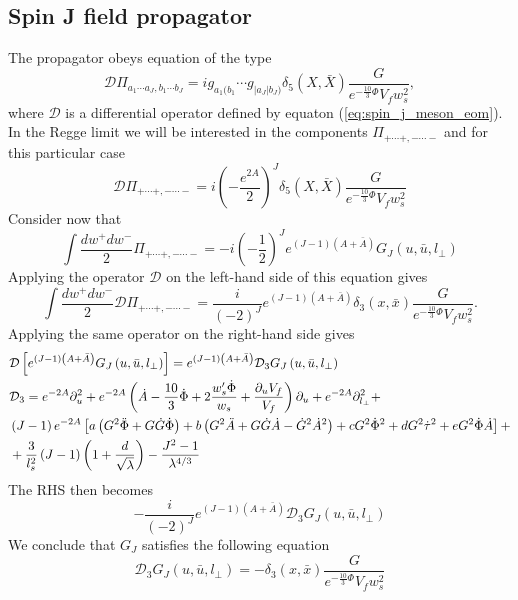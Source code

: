\documentclass[a4paper,12pt]{article}
\begin{document}
\subsection{Spin J field propagator}
The propagator obeys equation of the type
\begin{equation}
\mathcal{D} \Pi_{a_1 \cdots a_J, b_1 \cdots b_J} = i g_{a_1(b_1} \cdots g_{|a_J|b_J)} \delta_5 \left(X, \bar{X}\right) \frac{G}{e^{-\frac{10}{3}\Phi}V_f w_s^2},
\end{equation}
where $\mathcal{D}$ is a differential operator defined by equaton (\ref{eq:spin_j_meson_eom}).
In the Regge limit we will be interested in the components $\Pi_{+\cdots+,-\cdots-}$ and for this particular case
\begin{equation}
\mathcal{D} \Pi_{+\cdots+,-\cdots-} = i {\left( - \frac{e^{2A}}{2}\right)}^J  \delta_5 \left(X, \bar{X}\right) \frac{G}{e^{-\frac{10}{3}\Phi}V_f w_s^2}
\end{equation}
Consider now that
\begin{equation}
\int \frac{dw^+ dw^-}{2} \Pi_{+\cdots+, - \cdots -} = -i {\left(-\frac{1}{2}\right)}^J e^{\left(J-1\right)(A+\bar{A})} G_J \left(u, \bar{u}, l_\perp\right)
\end{equation}
Applying the operator $\mathcal{D}$ on the left-hand side of this equation gives
\begin{equation}
\int \frac{dw^+ dw^-}{2} \mathcal{D} \Pi_{+\cdots+, - \cdots -} = \frac{i}{{\left(-2\right)}^J} e^{\left(J-1\right)\left(A+\bar{A}\right)} \delta_3\left(x, \bar{x}\right) \frac{G}{e^{-\frac{10}{3}\Phi}V_f w_s^2}.
\end{equation}
Applying the same operator on the right-hand side gives
\begin{align}
&\mathcal{D} \left[ e^{\left(J-1\right) \left(A+\bar{A}\right)} G_J \left(u, \bar{u}, l_\perp\right) \right] = e^{\left(J-1\right)\left(A+\bar{A}\right)} \mathcal{D}_3 G_J \left(u, \bar{u}, l_\perp\right) \notag \\
&\mathcal{D}_3 = e^{-2A} \partial_u^2 + e^{-2A} \left( \dot{A} - \frac{10}{3} \dot{\Phi} + 2 \frac{w_s' \dot{\Phi}}{w_s} + \frac{\partial_u V_f}{V_f} \right) \partial_u + e^{-2A} \partial^2_{l_\perp} + \notag \\
& \left(J-1\right) e^{-2A} \left[ a \left(G^2\ddot{\Phi} + G \dot{G} \dot{\Phi} \right) + b \left(G^2 \ddot{A} + G \dot{G} \dot{A} - \dot{G}^2 {\dot{A}}^2\right) + c G^2 {\dot{\Phi}}^2 + d G^2 {\dot{\tau}}^2 + e G^2 \dot{\Phi} \dot{A} \right] + \notag \\
& + \frac{3}{l_s^2} \left(J-1\right)\left(1+\frac{d}{\sqrt{\lambda}}\right) - \frac{J^2-1}{\lambda^{4/3}}
\end{align}
The RHS then becomes
\begin{equation}
- \frac{i}{{\left(-2\right)}^J} e^{\left(J-1\right)\left(A+\bar{A}\right)} \mathcal{D}_3 G_J \left(u, \bar{u}, l_\perp\right)
\end{equation}
We conclude that $G_J$ satisfies the following equation
\begin{equation}
\mathcal{D}_3 G_J \left(u, \bar{u}, l_\perp\right) = - \delta_3 \left(x, \bar{x}\right) \frac{G}{e^{-\frac{10}{3} \Phi} V_f w_s^2}
\label{eq:transverse_propagator}
\end{equation}
\end{document}
